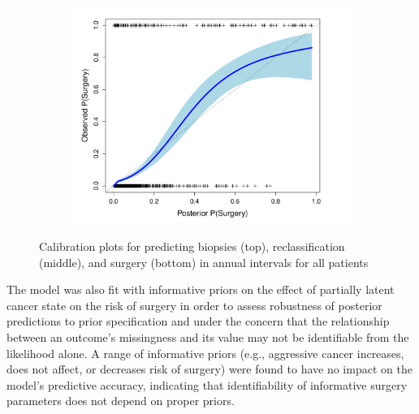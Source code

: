 \documentclass[12pt, letterpaper]{article}
\begin{document}
\begin{figure}
\begin{center}
\begin{subfigure}[b]{0.5\textwidth}
\includegraphics[width=\textwidth]{pred-vs-obs-rrp.pdf}
\end{subfigure}
\caption{Calibration plots for predicting biopsies (top), reclassification (middle), and surgery (bottom) in annual intervals for all patients} 
\label{fig:calibration-all-bx}
\end{center}
\end{figure}


The model was also fit with informative priors on the effect of partially latent cancer state on the risk of surgery in order to assess robustness of posterior predictions to prior specification and under the concern that the relationship between an outcome's missingness and its value may not be identifiable from the likelihood alone. A range of informative priors (e.g., aggressive cancer increases, does not affect, or decreases risk of surgery) were found to have no impact on the model's predictive accuracy, indicating that identifiability of informative surgery parameters does not depend on proper priors. %

\end{document}
